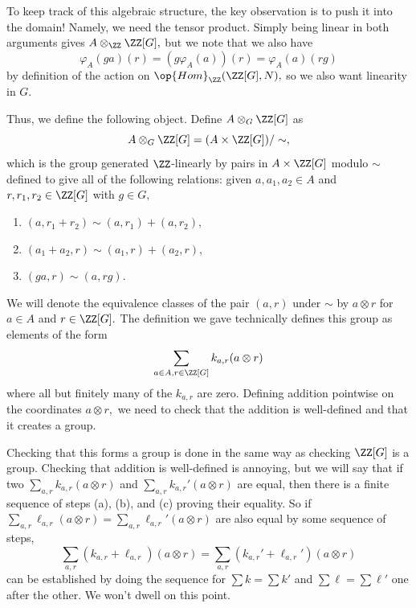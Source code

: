To keep track of this algebraic structure, the key observation is to push it into the domain! Namely, we need the tensor product. Simply being linear in both arguments gives $A\otimes_\ZZ\ZZ[G],$ but we note that we also have
\[\varphi_A(ga)(r)=(g\varphi_A(a))(r)=\varphi_A(a)(rg)\]
by definition of the action on $\op{Hom}_\ZZ(\ZZ[G],N),$ so we also want linearity in $G.$

Thus, we define the following object. Define $A\otimes_G\ZZ[G]$ as
\[A\otimes_G\ZZ[G]=(A\times\ZZ[G])/\sim,\]
which is the group generated $\ZZ$-linearly by pairs in $A\times\ZZ[G]$ modulo $\sim$ defined to give all of the following relations: given $a,a_1,a_2\in A$ and $r,r_1,r_2\in\ZZ[G]$ with $g\in G,$
\begin{enumerate}[label=(\alph*)]
    \item $(a,r_1+r_2)\sim(a,r_1)+(a,r_2),$
    \item $(a_1+a_2,r)\sim(a_1,r)+(a_2,r),$
    \item $(ga,r)\sim(a,rg).$
\end{enumerate}
We will denote the equivalence classes of the pair $(a,r)$ under $\sim$ by $a\otimes r$ for $a\in A$ and $r\in\ZZ[G].$ The definition we gave technically defines this group as elements of the form
\[\sum_{a\in A,r\in\ZZ[G]}k_{a,r}(a\otimes r)\]
where all but finitely many of the $k_{a,r}$ are zero. Defining addition pointwise on the coordinates $a\otimes r,$ we need to check that the addition is well-defined and that it creates a group.

Checking that this forms a group is done in the same way as checking $\ZZ[G]$ is a group. Checking that addition is well-defined is annoying, but we will say that if two $\sum_{a,r}k_{a,r}(a\otimes r)$ and $\sum_{a,r}k_{a,r}'(a\otimes r)$ are equal, then there is a finite sequence of steps (a), (b), and (c) proving their equality. So if $\sum_{a,r}\ell_{a,r}(a\otimes r)=\sum_{a,r}\ell_{a,r}'(a\otimes r)$ are also equal by some sequence of steps,
\[\sum_{a,r}(k_{a,r}+\ell_{a,r})(a\otimes r)=\sum_{a,r}(k_{a,r}'+\ell_{a,r}')(a\otimes r)\]
can be established by doing the sequence for $\sum k=\sum k'$ and $\sum\ell=\sum\ell'$ one after the other. We won't dwell on this point.

